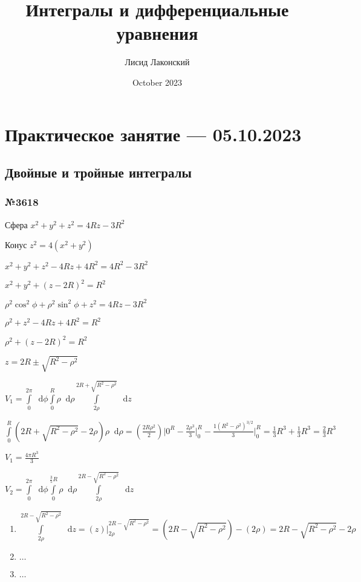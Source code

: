 \documentclass{article}
\title{Интегралы и дифференциальные уравнения}
\author{Лисид Лаконский}
\date{October 2023}
\newcommand*\diff{\mathop{}\!\mathrm{d}}
\begin{document}
\raggedright

\maketitle

\tableofcontents
\pagebreak

\section{Практическое занятие — 05.10.2023}

\subsection{Двойные и тройные интегралы}

\subsubsection{№3618}

Сфера $x^2 + y^2 + z^2 = 4 R z - 3R^2$

Конус $z^2 = 4 (x^2 + y^2)$

$x^2 + y^2 + z^2 - 4Rz+4R^2 = 4R^2 - 3R^2$

$x^2 + y^2 + (z - 2R)^2 = R^2$

$\rho^2 \cos^2 \phi + \rho^2 \sin^2 \phi + z^2 = 4 R z - 3R^2$

$\rho^2 + z^2 - 4 R z + 4 R^2 = R^2$

$\rho^2 + (z - 2R)^2 = R^2$

$z = 2R \pm \sqrt{R^2 - \rho^2}$

$V_1 = \int\limits_{0}^{2 \pi} \diff \phi \int\limits_{0}^{R} \rho \diff \rho \int\limits_{2 \rho}^{2 R + \sqrt{R^2 - \rho^2}} \diff z$

$\int\limits_{0}^{R} (2R + \sqrt{R^2 -\rho^2} - 2 \rho) \rho \diff \rho = (\frac{2R \rho^2}{2}) \bigg|{0}^{R} - \frac{2 \rho^3}{3} \bigg|_{0}^{R} - \frac{1 (R^2 - \rho^2)^{3/2}}{3} \bigg|_{0}^{R} = \frac{1}{3} R^3 + \frac{1}{3} R^3 = \frac{2}{3} R^3$

$V_1 = \frac{4 \pi R^3}{3}$

$V_2 = \int\limits_{0}^{2 \pi} \diff \phi \int\limits_{0}^{\frac{3}{5} R} \rho \diff \rho \int\limits_{2 \rho}^{2 R - \sqrt{R^2 - \rho^2}} \diff z$

\begin{enumerate}
    \item $\int\limits_{2 \rho}^{2 R - \sqrt{R^2 - \rho^2}} \diff z = (z) \bigg|_{2 \rho}^{2 R - \sqrt{R^2 - \rho^2}} = (2R - \sqrt{R^2 - \rho^2}) - (2 \rho) = 2R - \sqrt{R^2 - \rho^2} - 2\rho$
    \item $\dots$
    \item $\dots$
\end{enumerate}
\end{document}
